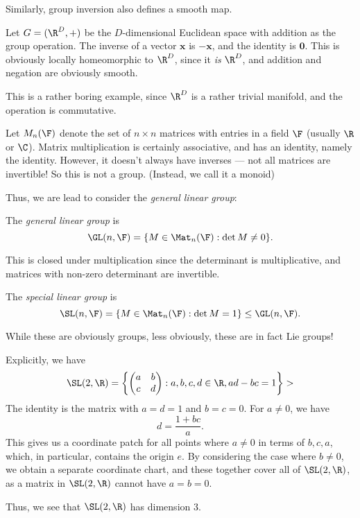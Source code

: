 \documentclass[a4paper]{article}
\begin{document}
Similarly, group inversion also defines a smooth map.

\begin{eg}
  Let $G = (\R^D, +)$ be the $D$-dimensional Euclidean space with addition as the group operation. The inverse of a vector $\mathbf{x}$ is $-\mathbf{x}$, and the identity is $\mathbf{0}$. This is obviously locally homeomorphic to $\R^D$, since it \emph{is} $\R^D$, and addition and negation are obviously smooth.
\end{eg}

This is a rather boring example, since $\R^D$ is a rather trivial manifold, and the operation is commutative.

\begin{eg}
  Let $M_n(\F)$ denote the set of $n\times n$ matrices with entries in a field $\F$ (usually $\R$ or $\C$). Matrix multiplication is certainly associative, and has an identity, namely the identity. However, it doesn't always have inverses --- not all matrices are invertible! So this is not a group. (Instead, we call it a monoid)
\end{eg}
Thus, we are lead to consider the \emph{general linear group}:

\begin{defi}
  The \emph{general linear group} is
  \[
    \GL(n, \F) = \{M \in \Mat_n(\F): \det M \not= 0\}.
  \]
\end{defi}
This is closed under multiplication since the determinant is multiplicative, and matrices with non-zero determinant are invertible.

\begin{defi}
  The \emph{special linear group} is
  \[
    \SL(n, \F) = \{M \in \Mat_n(\F): \det M =1\} \leq \GL(n, \F).
  \]
\end{defi}
While these are obviously groups, less obviously, these are in fact Lie groups!

\begin{eg}
  Explicitly, we have
  \[
    \SL(2, \R) = \left\{
      \begin{pmatrix}
        a & b\\
        c & d
      \end{pmatrix}:
    a, b, c, d \in \R, ad - bc = 1\right\}>
  \]
  The identity is the matrix with $a = d = 1$ and $b = c = 0$. For $a \not= 0$, we have
  \[
    d = \frac{1 + bc}{a}.
  \]
  This gives us a coordinate patch for all points where $a \not= 0$ in terms of $b, c, a$, which, in particular, contains the origin $e$. By considering the case where $b \not= 0$, we obtain a separate coordinate chart, and these together cover all of $\SL(2, \R)$, as a matrix in $\SL(2, \R)$ cannot have $a = b = 0$.

  Thus, we see that $\SL(2, \R)$ has dimension $3$.
\end{eg}
\end{document}
